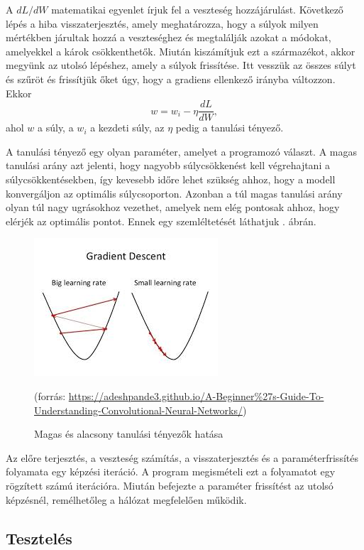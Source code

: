 A $dL/dW$ matematikai egyenlet írjuk fel a veszteség hozzájárulást. Következő lépés a hiba visszaterjesztés, amely meghatározza, hogy a súlyok milyen mértékben járultak hozzá a veszteséghez és megtalálják azokat a módokat, amelyekkel a károk csökkenthetők. Miután kiszámítjuk ezt a származékot, akkor megyünk az utolsó lépéshez, amely a súlyok frissítése. Itt vesszük az összes súlyt és szűröt és frissítjük őket úgy, hogy a gradiens ellenkező irányba változzon. Ekkor
$$
w = w_i - \eta \dfrac{dL}{dW},
$$
ahol $w$ a súly, a $w_i$ a kezdeti súly, az $\eta$ pedig a tanulási tényező.

A tanulási tényező egy olyan paraméter, amelyet a programozó választ. A magas tanulási arány azt jelenti, hogy nagyobb súlycsökkenést kell végrehajtani a súlycsökkentésekben, így kevesebb időre lehet szükség ahhoz, hogy a modell konvergáljon az optimális súlycsoporton. Azonban a túl magas tanulási arány olyan túl nagy ugrásokhoz vezethet, amelyek nem elég pontosak ahhoz, hogy elérjék az optimális pontot. Ennek egy szemléltetését láthatjuk . ábrán.

\begin{figure}[h]
\centering
\includegraphics[scale=0.8]{images/CNN_learning_rate}
\caption{Magas és alacsony tanulási tényezők hatása}
(forrás: \url{https://adeshpande3.github.io/A-Beginner%27s-Guide-To-Understanding-Convolutional-Neural-Networks/})
\label{fig:CNN_learning_rate}
\end{figure}

Az előre terjesztés, a veszteség számítás, a visszaterjesztés és a paraméterfrissítés folyamata egy képzési iteráció. A program megismételi ezt a folyamatot egy rögzített számú iterációra. Miután befejezte a paraméter frissítést az utolsó képzésnél, remélhetőleg a hálózat megfelelően működik.

\subsection{Tesztelés}

